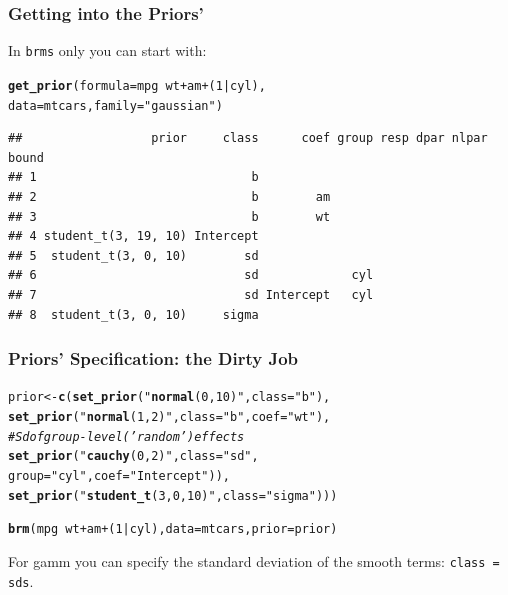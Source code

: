 \documentclass[handout]{beamer}\usepackage[]{graphicx}\usepackage[]{color}
\makeatletter
\newcommand{\hlnum}[1]{\textcolor[rgb]{0.686,0.059,0.569}{#1}}%
\newcommand{\hlstr}[1]{\textcolor[rgb]{0.192,0.494,0.8}{#1}}%
\newcommand{\hlcom}[1]{\textcolor[rgb]{0.678,0.584,0.686}{\textit{#1}}}%
\newcommand{\hlopt}[1]{\textcolor[rgb]{0,0,0}{#1}}%
\newcommand{\hlstd}[1]{\textcolor[rgb]{0.345,0.345,0.345}{#1}}%
\newcommand{\hlkwc}[1]{\textcolor[rgb]{0.333,0.667,0.333}{#1}}%
\newcommand{\hlkwd}[1]{\textcolor[rgb]{0.737,0.353,0.396}{\textbf{#1}}}%
\newenvironment{kframe}{%
 \def\at@end@of@kframe{}%
 \ifinner\ifhmode%
  \def\at@end@of@kframe{\end{minipage}}%
  \begin{minipage}{\columnwidth}%
 \fi\fi%
 \def\FrameCommand##1{\hskip\@totalleftmargin \hskip-\fboxsep
 \colorbox{shadecolor}{##1}\hskip-\fboxsep
     \hskip-\linewidth \hskip-\@totalleftmargin \hskip\columnwidth}%
 \MakeFramed {\advance\hsize-\width
   \@totalleftmargin\z@ \linewidth\hsize
   \@setminipage}}%
 {\par\unskip\endMakeFramed%
 \at@end@of@kframe}
\newenvironment{knitrout}{}{} %
\makeatother
\begin{document}
\begin{frame}[fragile]
\frametitle{Getting into the Priors'}

In \texttt{brms} only you can start with: \\

\begin{knitrout}
\color{fgcolor}\begin{kframe}
\begin{alltt}
\hlkwd{get_prior}\hlstd{(}\hlkwc{formula} \hlstd{= mpg} \hlopt{~} \hlstd{wt} \hlopt{+} \hlstd{am} \hlopt{+} \hlstd{(}\hlnum{1}\hlopt{|}\hlstd{cyl),}
          \hlkwc{data} \hlstd{= mtcars,} \hlkwc{family}\hlstd{=}\hlstr{"gaussian"}\hlstd{)}
\end{alltt}
\begin{verbatim}
##                  prior     class      coef group resp dpar nlpar bound
## 1                              b                                      
## 2                              b        am                            
## 3                              b        wt                            
## 4 student_t(3, 19, 10) Intercept                                      
## 5  student_t(3, 0, 10)        sd                                      
## 6                             sd             cyl                      
## 7                             sd Intercept   cyl                      
## 8  student_t(3, 0, 10)     sigma
\end{verbatim}
\end{kframe}
\end{knitrout}

\end{frame}


\begin{frame}[fragile]
\frametitle{Priors' Specification: the Dirty Job}

\begin{knitrout}
\color{fgcolor}\begin{kframe}
\begin{alltt}
prior <- \hlkwd{c}(\hlkwd{set_prior}(\hlstr{"\hlkwd{normal}(0,10)"}, class = \hlstr{"b"}), 
           \hlkwd{set_prior}(\hlstr{"\hlkwd{normal}(1,2)"}, class = \hlstr{"b"}, coef = \hlstr{"wt"}),
\hlcom{           # Sd of group-level (’random’) effects}
           \hlkwd{set_prior}(\hlstr{"\hlkwd{cauchy}(0,2)"}, class = \hlstr{"sd"}, 
            group = \hlstr{"cyl"}, coef = \hlstr{"Intercept"})), 
           \hlkwd{set_prior}(\hlstr{"\hlkwd{student_t}(3, 0, 10)"}, class = \hlstr{"sigma"}))) 


\hlkwd{brm}(mpg ~ wt + am + (1|cyl), data = mtcars, prior = prior)
\end{alltt}
\end{kframe}
\end{knitrout}
For gamm you can specify the standard deviation of the smooth terms: \texttt{class = sds}.

\end{frame}
\end{document}

